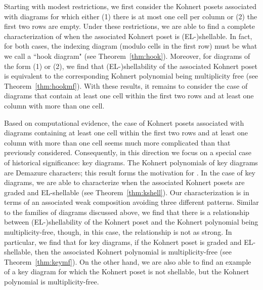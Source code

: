\documentclass[letterpaper,10pt]{article}
\begin{document}
Starting with modest restrictions, we first consider the Kohnert posets associated with diagrams for which either (1) there is at most one cell per column or (2) the first two rows are empty. Under these restrictions, we are able to find a complete characterization of when the associated Kohnert poset is (EL-)shellable. In fact, for both cases, the indexing diagram (modulo cells in the first row) must be what we call a ``hook diagram" (see Theorem~\ref{thm:hook}). Moreover, for diagrams of the form (1) or (2), we find that (EL-)shellability of the associated Kohnert poset is equivalent to the corresponding Kohnert polynomial being multiplicity free (see Theorem~\ref{thm:hookmf}). With these results, it remains to consider the case of diagrams that contain at least one cell within the first two rows and at least one column with more than one cell.

Based on computational evidence, the case of Kohnert posets associated with diagrams containing at least one cell within the first two rows and at least one column with more than one cell seems much more complicated than that previously considered. Consequently, in this direction we focus on a special case of historical significance: key diagrams. The Kohnert polynomials of key diagrams are Demazure characters; this result forms the motivation for \textbf{\cite{Kohnert}}. In the case of key diagrams, we are able to characterize when the associated Kohnert posets are graded and EL-shellable (see Theorem~\ref{thm:kshell}). Our characterization is in terms of an associated weak composition avoiding three different patterns. Similar to the families of diagrams discussed above, we find that there is a relationship between (EL-)shellability of the Kohnert poset and the Kohnert polynomial being multiplicity-free, though, in this case, the relationship is not as strong. In particular, we find that for key diagrams, if the Kohnert poset is graded and EL-shellable, then the associated Kohnert polynomial is multiplicity-free (see Theorem~\ref{thm:keymf}). On the other hand, we are also able to find an example of a key diagram for which the Kohnert poset is not shellable, but the Kohnert polynomial is multiplicity-free.
\end{document}

